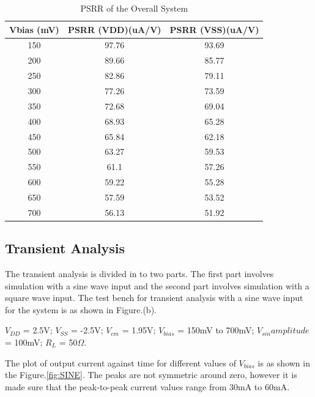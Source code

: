 \begin{table} [H]
\centering
\begin{tabular}{@{}ccc@{}}
\toprule
Vbias (mV)			& PSRR (VDD)(uA/V)			& PSRR (VSS)(uA/V)	 \\ \midrule
150					& 97.76	 					& 93.69					 \\
200					& 89.66 					& 85.77					 \\
250					& 82.86 					& 79.11					 \\
300					& 77.26 					& 73.59					 \\
350					& 72.68						& 69.04					 \\
400					& 68.93						& 65.28					 \\
450					& 65.84 					& 62.18					 \\
500					& 63.27						& 59.53					 \\
550					& 61.1	 					& 57.26					 \\
600					& 59.22 					& 55.28					 \\
650					& 57.59 					& 53.52					 \\
700 				& 56.13 					& 51.92					 \\
\bottomrule
\end{tabular}
\caption{PSRR of the Overall System}
\label{tab:PSRR}
\end{table}

\subsection{Transient Analysis}
The transient analysis is divided in to two parts. The first part involves simulation with a sine wave input and the second part involves simulation with a square wave input. The test bench for transient analysis with a sine wave input for the system is as shown in Figure.(b).

$V_{DD}$ = 2.5V; $V_{SS}$ = -2.5V; $V_{cm}$ = 1.95V; $V_{bias}$ = 150mV to 700mV;  $V_{sin} amplitude$ = 100mV; $R_{L}$ = 50$\Omega$.

The plot of output current against time for different values of $V_{bias}$ is as shown in the Figure.\ref{fig:SINE}. The peaks are not symmetric around zero, however it is made sure that the peak-to-peak current values range from 30mA to 60mA.

